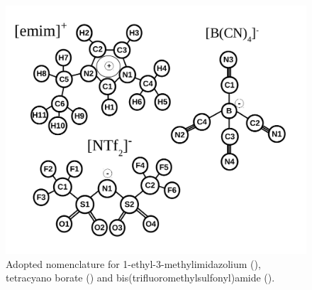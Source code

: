 \documentclass[3p,twocolumn]{elsarticle}
\begin{document}
\begin{figure}[ht]
\centering
\includegraphics[width=\linewidth]{atoms_id.pdf}
\caption{Adopted nomenclature for 1-ethyl-3-methylimidazolium  (\ce{[emim]^+}), tetracyano borate (\ce{[B(CN)_4]^-}) and bis(trifluoromethylsulfonyl)amide (\ce{[NTf_2]^-}).}
\label{fig:atoms_id}
\end{figure}
\end{document}
